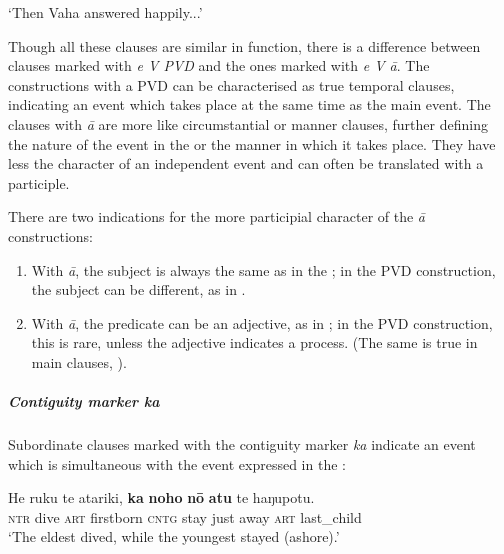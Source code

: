 \glt
‘Then Vaha answered happily...’ \textstyleExampleref{[R304.098]} 
\z

Though all these clauses are similar in function, there is a difference between clauses marked with \textit{e V PVD} and the ones marked with \textit{e V {\ꞌ}ā}. The constructions with a PVD can be characterised as true temporal clauses, indicating an event which takes place at the same time as the main event. The clauses with \textit{{\ꞌ}ā} are more like circumstantial or manner clauses, further defining the nature of the event in the  or the manner in which it takes place. They have less the character of an independent event and can often be translated with a participle.

There are two indications for the more participial character of the \textit{{\ꞌ}ā} constructions:

\begin{enumerate}
\item 
With \textit{{\ꞌ}ā}, the subject is always the same as in the ; in the PVD construction, the subject can be different, as in .

\item 
With \textit{{\ꞌ}ā}, the predicate can be an adjective, as in ; in the PVD construction, this is rare, unless the adjective indicates a process. (The same is true in main clauses, ).

\end{enumerate}

\subparagraph{Contiguity marker \textit{ka}} Subordinate clauses marked with the contiguity marker \textit{ka} indicate an event which is simultaneous with the event expressed in the : 

\ea\label{ex:11.228}
\gll He ruku te {\ꞌ}atariki, \textbf{ka} \textbf{noho} \textbf{nō} \textbf{atu} te haŋupotu. \\
\textsc{ntr} dive \textsc{art} firstborn \textsc{cntg} stay just away \textsc{art} last\_child \\

\glt 
‘The eldest dived, while the youngest stayed (ashore).’ \textstyleExampleref{[Mtx-7-30.012]}
\z


